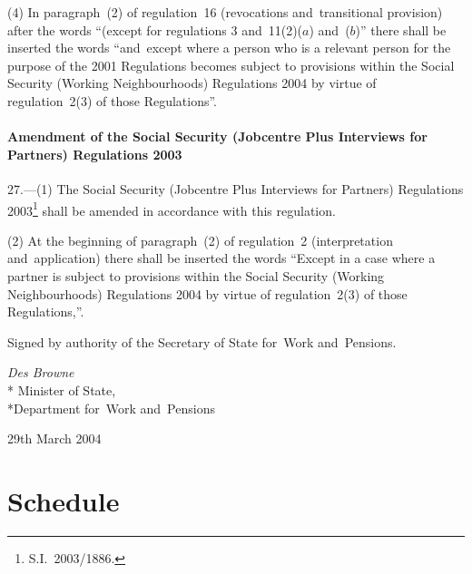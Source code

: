 \documentclass[12pt,a4paper]{article}
\begin{document}
(4) In paragraph~(2) of regulation~16 (revocations and~transitional provision) after the words “(except for regulations 3 and~11(2)($a$)  and~($b$)” there shall be inserted the words “and~except where a person who is a relevant person for the purpose of the 2001 Regulations becomes subject to provisions within the Social Security (Working Neighbourhoods) Regulations 2004 by virtue of regulation~2(3) of those Regulations”.

\subsection[27. Amendment of the Social Security (Jobcentre Plus Interviews for Partners) Regulations 2003]{Amendment of the Social Security (Jobcentre Plus Interviews for Partners) Regulations 2003}

27.---(1)  The Social Security (Jobcentre Plus Interviews for Partners) Regulations 2003\footnote{S.I.~2003/1886.} shall be amended in accordance with this regulation.

(2) At the beginning of paragraph~(2) of regulation~2 (interpretation and~application) there shall be inserted the words “Except in a case where a partner is subject to provisions within the Social Security (Working Neighbourhoods) Regulations 2004 by virtue of regulation~2(3) of those Regulations,”. 

\bigskip

Signed 
by authority of the 
Secretary of State for~Work and~Pensions.

{\raggedleft
\emph{Des Browne}\\*
Minister
of State,\\*Department 
for~Work and~Pensions

}

29th March 2004

\small

\part{Schedule}

\renewcommand\parthead{--- Schedule}
\end{document}
